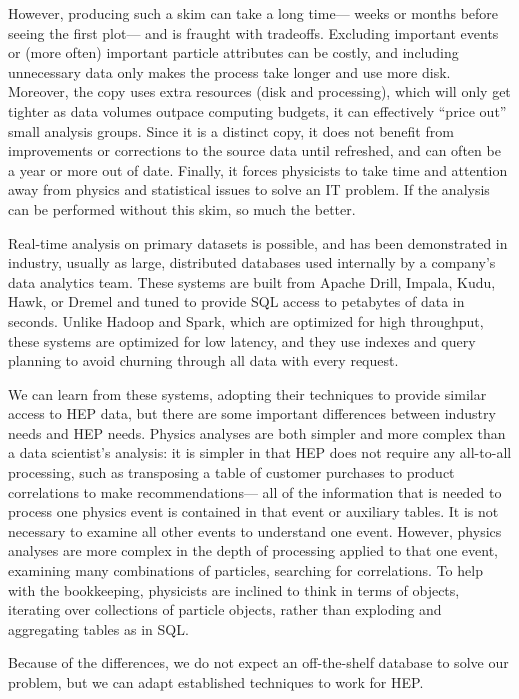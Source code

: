 \documentclass[a4paper]{jpconf}
\begin{document}
However, producing such a skim can take a long time--- weeks or months before seeing the first plot--- and is fraught with tradeoffs. Excluding important events or (more often) important particle attributes can be costly, and including unnecessary data only makes the process take longer and use more disk. Moreover, the copy uses extra resources (disk and processing), which will only get tighter as data volumes outpace computing budgets, it can effectively ``price out'' small analysis groups. Since it is a distinct copy, it does not benefit from improvements or corrections to the source data until refreshed, and can often be a year or more out of date. Finally, it forces physicists to take time and attention away from physics and statistical issues to solve an IT problem. If the analysis can be performed without this skim, so much the better.

Real-time analysis on primary datasets is possible, and has been demonstrated in industry, usually as large, distributed databases used internally by a company's data analytics team. These systems are built from Apache Drill, Impala, Kudu, Hawk, or Dremel and tuned to provide SQL access to petabytes of data in seconds. Unlike Hadoop and Spark, which are optimized for high throughput, these systems are optimized for low latency, and they use indexes and query planning to avoid churning through all data with every request.

We can learn from these systems, adopting their techniques to provide similar access to HEP data, but there are some important differences between industry needs and HEP needs. Physics analyses are both simpler and more complex than a data scientist's analysis: it is simpler in that HEP does not require any all-to-all processing, such as transposing a table of customer purchases to product correlations to make recommendations--- all of the information that is needed to process one physics event is contained in that event or auxiliary tables. It is not necessary to examine all other events to understand one event. However, physics analyses are more complex in the depth of processing applied to that one event, examining many combinations of particles, searching for correlations. To help with the bookkeeping, physicists are inclined to think in terms of objects, iterating over collections of particle objects, rather than exploding and aggregating tables as in SQL.

Because of the differences, we do not expect an off-the-shelf database to solve our problem, but we can adapt established techniques to work for HEP.
\end{document}

